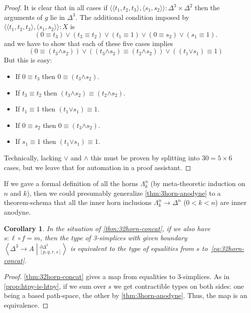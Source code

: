 \documentclass[12pt]{amsart}
\theoremstyle{plain}
\newtheorem{cor}[thm]{Corollary}
\theoremstyle{definition}
\theoremstyle{remark}
\numberwithin{equation}{section}
\newcommand{\ndexten}[4]{\left\langle #1 \to #2 \middle|^{#3}_{#4}\right\rangle}
\newcommand{\jdeq}{\equiv}
\newcommand{\pair}[1]{\langle #1\rangle}
\begin{document}
\begin{proof}
  It is clear that in all cases if $\pair{\pair{t_1,t_2,t_3},\pair{s_1,s_2}}:\Delta^3\times\Delta^2$ then the arguments of $g$ lie in $\Delta^3$.
  The additional condition imposed by $\pair{\pair{t_1,t_2,t_3},\pair{s_1,s_2}}:X$ is
  \begin{equation*}
    (0\jdeq t_3) \lor (t_3\jdeq t_2) \lor (t_1 \jdeq 1) \lor (0\jdeq s_2) \lor (s_1\jdeq 1).
  \end{equation*}
  and we have to show that each of these five cases implies
  \[ (0\jdeq (t_3 \mathbin{\pmb{\land}} s_2)) \lor
  ((t_3 \mathbin{\pmb{\land}} s_2) \jdeq (t_2 \mathbin{\pmb{\land}} s_2)) \lor
  ((t_1 \mathbin{\pmb{\lor}} s_1)\jdeq 1)
  \]
  But this is easy:
  \begin{itemize}
  \item If $0\jdeq t_3$ then $0\jdeq (t_3 \mathbin{\pmb{\land}} s_2)$.
  \item If $t_3\jdeq t_2$ then $(t_3 \mathbin{\pmb{\land}} s_2) \jdeq (t_2 \mathbin{\pmb{\land}} s_2)$.
  \item If $t_1 \jdeq 1$ then $(t_1 \mathbin{\pmb{\lor}} s_1)\jdeq 1$.
  \item If $0\jdeq s_2$ then $0\jdeq (t_3 \mathbin{\pmb{\land}} s_2)$.
  \item If $s_1\jdeq 1$ then $(t_1 \mathbin{\pmb{\lor}} s_1)\jdeq 1$.
  \end{itemize}
  Technically, lacking $\pmb{\lor}$ and $\pmb{\land}$ this must be proven by splitting into $30 = 5\times 6$ cases, but we leave that for automation in a proof assistant.
\end{proof}

If we gave a formal definition of all the horns $\Lambda^n_k$ (by meta-theoretic induction on $n$ and $k$), then we could presumably generalize \cref{thm:3horn-anodyne} to a theorem-schema that all the inner horn inclusions $\Lambda^n_k\to \Delta^n$ ($0<k<n$) are inner anodyne.

\begin{cor}\label{thm:32horn-is-concat}
  In the situation of \cref{thm:32horn-concat}, if we also have $s:\ell\circ f = m$, then the type of 3-simplices with given boundary $\ndexten{\Delta^3}{A}{\partial\Delta^3}{[p,q,r,s]}$ is equivalent to the type of equalities from $s$ to~\eqref{eq:32horn-concat}.
\end{cor}
\begin{proof}
  \cref{thm:32horn-concat} gives a map from equalities to 3-simplices.
  As in \cref{prop:htpy-is-htpy}, if we sum over $s$ we get contractible types on both sides: one being a based path-space, the other by \cref{thm:3horn-anodyne}.
  Thus, the map is an equivalence.
\end{proof}
\end{document}

